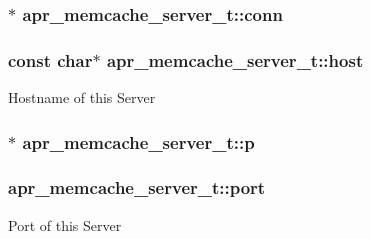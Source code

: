 \subsubsection[{\texorpdfstring{conn}{conn}}]{$\ast$ apr\+\_\+memcache\+\_\+server\+\_\+t\+::conn}\hypertarget{structapr__memcache__server__t_ada8c44030313b85cfd00d3abddc5f8f6}{}\label{structapr__memcache__server__t_ada8c44030313b85cfd00d3abddc5f8f6}
\subsubsection[{\texorpdfstring{host}{host}}]{\setlength{\rightskip}{0pt plus 5cm}const char$\ast$ apr\+\_\+memcache\+\_\+server\+\_\+t\+::host}\hypertarget{structapr__memcache__server__t_a3f0cbe5cde09d28791f8a8950258b305}{}\label{structapr__memcache__server__t_a3f0cbe5cde09d28791f8a8950258b305}
Hostname of this Server 
\subsubsection[{\texorpdfstring{p}{p}}]{$\ast$ apr\+\_\+memcache\+\_\+server\+\_\+t\+::p}\hypertarget{structapr__memcache__server__t_a2acd73a302db659fb888889837ce4fc3}{}\label{structapr__memcache__server__t_a2acd73a302db659fb888889837ce4fc3}
\subsubsection[{\texorpdfstring{port}{port}}]{ apr\+\_\+memcache\+\_\+server\+\_\+t\+::port}\hypertarget{structapr__memcache__server__t_aade2ee234b229b6711a80fe2a3de853b}{}\label{structapr__memcache__server__t_aade2ee234b229b6711a80fe2a3de853b}
Port of this Server 
